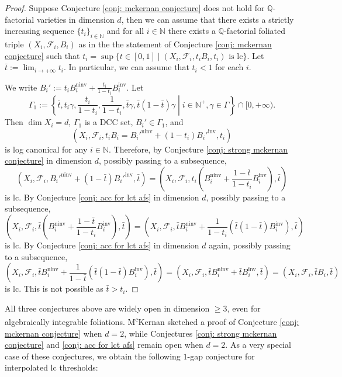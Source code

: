 \documentclass[12pt]{amsart}
\numberwithin{equation}{section}
\newcommand{\Qq}{\mathbb{Q}}
\newcommand{\ninv}{\operatorname{ninv}}
\newcommand{\inv}{\operatorname{inv}}
\newcommand{\Ff}{\mathcal{F}}
\newcommand{\Ii}{\Gamma}
\theoremstyle{definition}
\theoremstyle{definition}
\theoremstyle{definition}
\begin{document}
\begin{proof}
    Suppose Conjecture \ref{conj: mckernan conjecture} does not hold for $\Qq$-factorial varieties in dimension $d$, then we can assume that there exists a strictly increasing sequence
    $\{t_i \}_{i \in \mathbb N}$ 
    and  for all
    $i \in \mathbb N$ there exists a $\Qq$-factorial foliated triple $(X_i,\Ff_i,B_i)$ as in the the statement of  
    Conjecture \ref{conj: mckernan conjecture} such that
    $t_i=\sup\{t\in [0,1]\mid (X_i,\Ff_i,t_iB_i,t_i)\text{ is lc}\}$.
    Let 
    $\bar t:=\lim_{i\rightarrow+\infty}t_i$.
    In particular, we can assume that  $t_i<1$ for each $i$. 
    
    We write $B_i':=t_iB_i^{\ninv}+\frac{t_i}{1-t_i}B_i^{\inv}$. Let $$\Ii_1:=\left\{\bar t, t_i\gamma,\frac{t_i}{1-t_i},\frac{1}{1-t_i},\bar t\gamma,\bar t(1-\bar t)\gamma \middle\vert i\in\mathbb N^+,\gamma\in\Ii\right\}\cap [0,+\infty).$$ Then $\dim X_i=d$, $\Ii_1$ is a DCC set, $B_i'\in\Ii_1$, and
    $$(X_i,\Ff_i,t_iB_i=B_i'^{\ninv}+(1-t_i)B_i'^{\inv},t_i)$$
    is log canonical for any $i \in \mathbb N$. 
    Therefore, by Conjecture \ref{conj: strong mckernan conjecture} in dimension $d$, possibly passing to a subsequence, 
    $$(X_i,\Ff_i,B_i'^{\ninv}+(1-\bar t)B_i'^{\inv},\bar t)=\left(X_i,\Ff_i,t_i\left(B_i^{\ninv}+\frac{1-\bar t}{1-t_i}B_i^{\inv}\right),\bar t\right)$$
    is lc. By Conjecture \ref{conj: acc for lct afs} in dimension $d$, possibly passing to a subsequence, 
    $$\left(X_i,\Ff_i,\bar t\left(B_i^{\ninv}+\frac{1-\bar t}{1-t_i}B_i^{\inv}\right),\bar t\right)=\left(X_i,\Ff_i,\bar t B_i^{\ninv}+\frac{1}{1-t_i}(\bar t(1-\bar t)B_i^{\inv}),\bar t\right)$$
    is lc. By Conjecture \ref{conj: acc for lct afs} in dimension $d$ again, possibly passing to a subsequence, 
    $$\left(X_i,\Ff_i,\bar t B_i^{\ninv}+\frac{1}{1-\bar t}(\bar t(1-\bar t)B_i^{\inv}),\bar t\right)=\left(X_i,\Ff_i,\bar t B_i^{\ninv}+\bar tB_i^{\inv},\bar t\right)=(X_i,\Ff_i,\bar tB_i,\bar t)$$
    is lc. This is not possible as $\bar t>t_i$.
\end{proof}

All three conjectures above are widely open in dimension $\geq 3$, even for algebraically integrable foliations. M\textsuperscript{c}Kernan sketched a proof of Conjecture \ref{conj: mckernan conjecture} \cite{McK22} when $d=2$, while Conjectures \ref{conj: strong mckernan conjecture} and \ref{conj: acc for lct afs} remain open when $d=2$. As a very special case of these conjectures, we obtain the following $1$-gap conjecture for interpolated lc thresholds:
\end{document}
